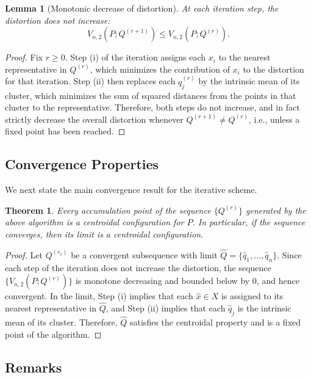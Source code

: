 \documentclass[12pt, reqno]{amsart}
\theoremstyle{plain}
\newtheorem{theorem}[subsection]{Theorem}
\newtheorem{lemma}[subsection]{Lemma}
\theoremstyle{definition}
\begin{document}
\begin{lemma}[Monotonic decrease of distortion]
At each iteration step, the distortion does not increase:
\[
V_{n,2}(P; {Q}^{(r+1)}) \le V_{n,2}(P; {Q}^{(r)}).
\]
\end{lemma}
\begin{proof}
Fix $r \ge 0$. Step (i) of the iteration assigns each $ {x}_i$ to the nearest representative in $ {Q}^{(r)}$,
which minimizes the contribution of $ {x}_i$ to the distortion for that iteration. Step (ii) then replaces
each $ {q}^{(r)}_j$ by the intrinsic mean of its cluster, which minimizes the sum of squared distances from
the points in that cluster to the representative. Therefore, both steps do not increase, and in fact strictly
decrease the overall distortion whenever $ {Q}^{(r+1)} \neq  {Q}^{(r)}$, i.e.,  unless a fixed point has been reached.  
\end{proof} 
 
\subsection{Convergence Properties}

We next state the main convergence result for the iterative scheme.

\begin{theorem} \label{Algorithem}
Every accumulation point of the sequence $\{ {Q}^{(r)}\}$ generated by the above algorithm is a centroidal
configuration for $P$. In particular, if the sequence converges, then its limit is a centroidal configuration.
\end{theorem}
\medskip

\begin{proof}
Let $ {Q}^{(r_\ell)}$ be a convergent subsequence with limit
$\widehat{ {Q}} = \{\widehat{ {q}}_1, \ldots, \widehat{ {q}}_n\}$. Since each step of the iteration does not
increase the distortion, the sequence $\{V_{n,2}(P; {Q}^{(r)})\}$ is monotone decreasing and bounded below
by $0$, and hence convergent. In the limit, Step (i) implies that each $\widehat{ {x}} \in  {X}$ is assigned to
its nearest representative in $\widehat{ {Q}}$, and Step (ii) implies that each $\widehat{ {q}}_j$ is the intrinsic
mean of its cluster. Therefore, $\widehat{ {Q}}$ satisfies the centroidal property and is a fixed point of the
algorithm. 
\end{proof} 

\subsection{Remarks}
\end{document}
